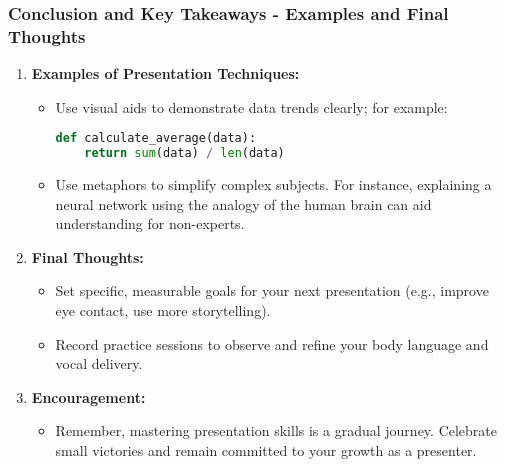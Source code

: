 \documentclass[aspectratio=169]{beamer}
\begin{document}
\begin{frame}[fragile]
    \frametitle{Conclusion and Key Takeaways - Examples and Final Thoughts}
    \begin{enumerate}
        \item \textbf{Examples of Presentation Techniques:}
        \begin{itemize}
            \item Use visual aids to demonstrate data trends clearly; for example:
            \begin{lstlisting}[language=Python]
def calculate_average(data):
    return sum(data) / len(data)
            \end{lstlisting}
            \item Use metaphors to simplify complex subjects. For instance, explaining a neural network using the analogy of the human brain can aid understanding for non-experts.
        \end{itemize}

        \item \textbf{Final Thoughts:}
        \begin{itemize}
            \item Set specific, measurable goals for your next presentation (e.g., improve eye contact, use more storytelling).
            \item Record practice sessions to observe and refine your body language and vocal delivery.
        \end{itemize}
        
        \item \textbf{Encouragement:}
        \begin{itemize}
            \item Remember, mastering presentation skills is a gradual journey. Celebrate small victories and remain committed to your growth as a presenter.
        \end{itemize}
    \end{enumerate}
\end{frame}
\end{document}
